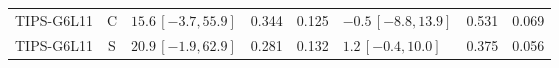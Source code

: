 \documentclass[10pt,a4paper]{article}
\begin{document}
\begin{longtable}{lcp{37mm}rrp{37mm}rr}
TIPS-G6L11 & C & \(15.6\,[-3.7,55.9]\) & 0.344 & 0.125 & \(-0.5\,[-8.8,13.9]\) & 0.531 & 0.069\\
TIPS-G6L11 & S & \(20.9\,[-1.9,62.9]\) & 0.281 & 0.132 & \(1.2\,[-0.4,10.0]\) & 0.375 & 0.056\\

\end{longtable}
\end{document}
